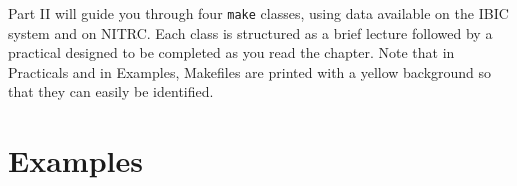 \documentclass[oneside,11pt]{memoir}
\newcommand\maken{\texttt{make}} %
\begin{document}
	\begin{vplace}[0.7]
		
		\thispagestyle{empty}
		\large
		\noindent Part II will guide you through four \maken{} classes, using data available on the IBIC system and on NITRC. Each class is structured as a brief lecture followed by a practical designed to be completed as you read the chapter.
		Note that in Practicals and in Examples, Makefiles are printed with a yellow background so that they can easily be identified. 
		
	\end{vplace}
	
	\renewcommand{\chaptername}{Practical}
	\renewcommand{\chapterautorefname}{Practical}
	
	
	
	
	
	\part{Examples}
	
	\renewcommand{\chaptername}{Example}
	\renewcommand{\chapterautorefname}{Example}
	
	
	
%	
	
	\cleardoublepage
	
	
	
\end{document}
